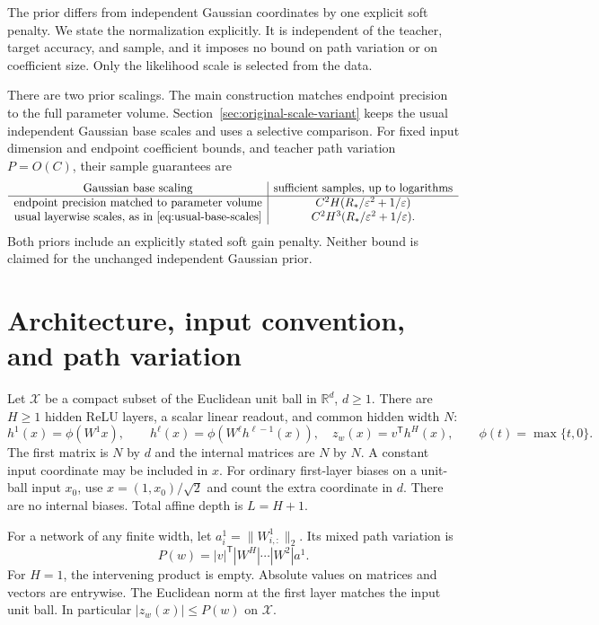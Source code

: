 \documentclass[11pt]{article}
\theoremstyle{definition}\newtheorem{definition}[theorem]{Definition}
\theoremstyle{remark}\newtheorem{remark}[theorem]{Remark}
\newcommand{\R}{\mathbb R}\newcommand{\E}{\mathbb E}\newcommand{\Prob}{\mathbb P}
\begin{document}
The prior differs from independent Gaussian coordinates by one explicit soft penalty. We state the normalization explicitly. It is independent of the teacher, target accuracy, and sample, and it imposes no bound on path variation or on coefficient size. Only the likelihood scale is selected from the data.

There are two prior scalings. The main construction matches endpoint precision to the full parameter volume. Section~\ref{sec:original-scale-variant} keeps the usual independent Gaussian base scales and uses a selective comparison. For fixed input dimension and endpoint coefficient bounds, and teacher path variation $P=O(C)$, their sample guarantees are
\[
 \begin{array}{c|c}
 \text{Gaussian base scaling}&\text{sufficient samples, up to logarithms}\\\hline
 \text{endpoint precision matched to parameter volume}
    &C^2H(R_*/\varepsilon^2+1/\varepsilon)\\
 \text{usual layerwise scales, as in~\eqref{eq:usual-base-scales}}
    &C^2H^3(R_*/\varepsilon^2+1/\varepsilon).
 \end{array}
\]
Both priors include an explicitly stated soft gain penalty. Neither bound is claimed for the unchanged independent Gaussian prior.

\section{Architecture, input convention, and path variation}
Let $\mathcal X$ be a compact subset of the Euclidean unit ball in $\R^d$, $d\ge1$. There are $H\ge1$ hidden ReLU layers, a scalar linear readout, and common hidden width $N$:
\[
 h^1(x)=\phi(W^1x),\qquad h^\ell(x)=\phi(W^\ell h^{\ell-1}(x)),\quad
 z_w(x)=v^{\mathsf T}h^H(x),\qquad\phi(t)=\max\{t,0\}.
\]
The first matrix is $N$ by $d$ and the internal matrices are $N$ by $N$. A constant input coordinate may be included in $x$. For ordinary first-layer biases on a unit-ball input $x_0$, use $x=(1,x_0)/\sqrt2$ and count the extra coordinate in $d$. There are no internal biases. Total affine depth is $L=H+1$.

For a network of any finite width, let $a^1_i=\|W^1_{i,:}\|_2$. Its mixed path variation is
\begin{equation}
 P(w)=|v|^{\mathsf T}|W^H|\cdots|W^2|a^1.
 \label{eq:pathnorm}
\end{equation}
For $H=1$, the intervening product is empty. Absolute values on matrices and vectors are entrywise. The Euclidean norm at the first layer matches the input unit ball. In particular $|z_w(x)|\le P(w)$ on $\mathcal X$.
\end{document}

